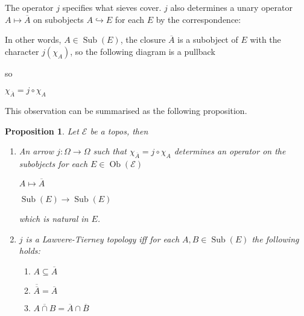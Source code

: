 \documentclass[a4paper]{article}
\theoremstyle{defin}
\theoremstyle{theorem}
\theoremstyle{claim}
\theoremstyle{prop}
\newtheorem{prop}{Proposition}
\theoremstyle{lemma}
\theoremstyle{fact}
\theoremstyle{ex}
\theoremstyle{col}
\begin{document}
The operator $j$ specifies what sieves cover. $j$ also determines a unary operator $A \mapsto \overline{A}$ on subobjects $A \hookrightarrow E$ for each $E$ by the correspondence:

\centerline{
}

In other words, $A \in \operatorname{Sub}(E)$, the closure $\overline{A}$ is a subobject of $E$ with the character $j(\chi_A)$, so the following diagram is a pullback

\centerline{
}
so
\begin{center}
$\chi_{\overline{A}} = j \circ \chi_A$
\end{center}

This observation can be summarised as the following proposition.
\begin{prop} Let $\mathcal{E}$ be a topos, then
\begin{enumerate}
\item An arrow $j : \Omega \to \Omega$ such that $\chi_{\overline{A}} = j \circ \chi_A$ determines an operator on the subobjects for each $E \in \operatorname{Ob}(\mathcal{E})$

\begin{center}
$A \mapsto \overline{A}$

$\operatorname{Sub}(E) \to \operatorname{Sub}(E)$
\end{center}
which is natural in $E$.

\item $j$ is a Lawvere-Tierney topology iff for each $A, B \in \operatorname{Sub}(E)$ the following holds:
\begin{enumerate}
\item $A \subseteq \overline{A}$
\item $\overline{\overline{A}} = \overline{A}$
\item $\overline{A \cap B} = \overline{A} \cap \overline{B}$
\end{enumerate}
\end{enumerate}
\end{prop}
\end{document}
